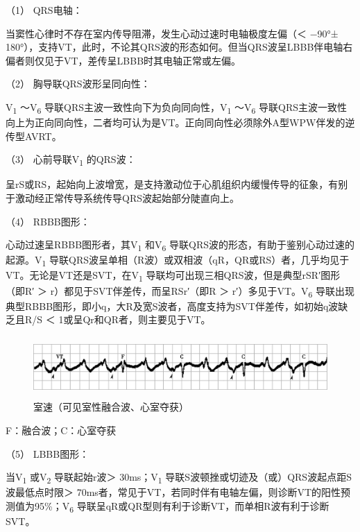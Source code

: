\hypertarget{text00295.htmlux5cux23CHP10-2-8-2-2-4-1}{}
（1） QRS电轴：

当窦性心律时不存在室内传导阻滞，发生心动过速时电轴极度左偏（＜ −90°±
180°），支持VT，此时，不论其QRS波的形态如何。但当QRS波呈LBBB伴电轴右偏者则仅见于VT，差传呈LBBB时其电轴正常或左偏。

\hypertarget{text00295.htmlux5cux23CHP10-2-8-2-2-4-2}{}
（2） 胸导联QRS波形呈同向性：

V\textsubscript{1} ～V\textsubscript{6}
导联QRS主波一致性向下为负向同向性，V\textsubscript{1}
～V\textsubscript{6}
导联QRS主波一致性向上为正向同向性，二者均可认为是VT。正向同向性必须除外A型WPW伴发的逆传型AVRT。

\hypertarget{text00295.htmlux5cux23CHP10-2-8-2-2-4-3}{}
（3） 心前导联V\textsubscript{1} 的QRS波：

呈rS或RS，起始向上波增宽，是支持激动位于心肌组织内缓慢传导的征象，有别于激动经正常传导系统传导QRS波起始部分陡直向上。

\hypertarget{text00295.htmlux5cux23CHP10-2-8-2-2-4-4}{}
（4） RBBB图形：

心动过速呈RBBB图形者，其V\textsubscript{1} 和V\textsubscript{6}
导联QRS波的形态，有助于鉴别心动过速的起源。V\textsubscript{1}
导联QRS波呈单相（R波）或双相波（qR，QR或RS）者，几乎均见于VT。无论是VT还是SVT，在V\textsubscript{1}
导联均可出现三相QRS波，但是典型rSR′图形（即R′ ＞
r）都见于SVT伴差传，而呈RSr′（即R ＞ r′）多见于VT。V\textsubscript{6}
导联出现典型RBBB图形，即小q，大R及宽S波者，高度支持为SVT伴差传，如初始q波缺乏且R/S
＜ 1或呈Qr和QR者，则主要见于VT。

\begin{figure}[!htbp]
 \centering
 \includegraphics[width=5.90625in,height=0.91667in]{./images/Image00453.jpg}
 \captionsetup{justification=centering}
 \caption{室速（可见室性融合波、心室夺获）}
 \label{fig102-15}
  \end{figure} 

F：融合波；C：心室夺获

\hypertarget{text00295.htmlux5cux23CHP10-2-8-2-2-4-5}{}
（5） LBBB图形：

当V\textsubscript{1} 或V\textsubscript{2} 导联起始r波＞
30ms；V\textsubscript{1}
导联S波顿挫或切迹及（或）QRS波起点距S波最低点时限＞
70ms者，常见于VT，若同时伴有电轴左偏，则诊断VT的阳性预测值为95\%；V\textsubscript{6}
导联呈qR或QR型则有利于诊断VT，而单相R波有利于诊断SVT。

